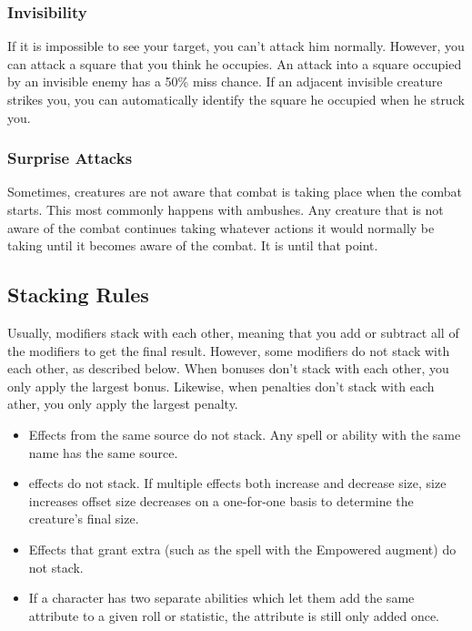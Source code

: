         \subsubsection{Invisibility}\label{Invisibility}
            If it is impossible to see your target, you can't attack him normally. However, you can attack a square that you think he occupies. An attack into a square occupied by an invisible enemy has a 50\% miss chance. If an adjacent invisible creature strikes you, you can automatically identify the square he occupied when he struck you.

        \subsubsection{Surprise Attacks}\label{Surprise Attacks}
            Sometimes, creatures are not aware that combat is taking place when the combat starts. This most commonly happens with ambushes. Any creature that is not aware of the combat continues taking whatever actions it would normally be taking until it becomes aware of the combat. It is \unaware until that point.

    \subsection{Stacking Rules}\label{Stacking Rules}
        Usually, modifiers stack with each other, meaning that you add or subtract all of the modifiers to get the final result. However, some modifiers do not stack with each other, as described below. When bonuses don't stack with each other, you only apply the largest bonus. Likewise, when penalties don't stack with each ather, you only apply the largest penalty.


        \begin{itemize}
            \item Effects from the same source do not stack. Any spell or ability with the same name has the same source.
            \item {} effects do not stack.
                If multiple effects both increase and decrease size, size increases offset size decreases on a one-for-one basis to determine the creature's final size.
            \item Effects that grant extra  (such as the  spell with the Empowered augment) do not stack.
            \item If a character has two separate abilities which let them add the same attribute to a given roll or statistic, the attribute is still only added once.
        \end{itemize}

